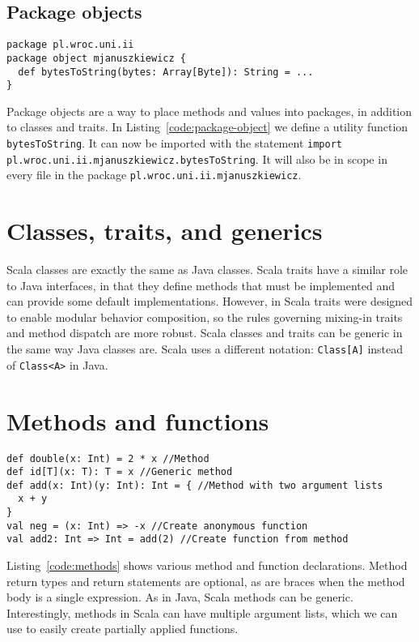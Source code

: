 \subsection{Package objects}

\begin{lstlisting}[caption=Package object, label=code:package-object, escapechar=|, float, floatplacement=H]
package pl.wroc.uni.ii
package object mjanuszkiewicz {
  def bytesToString(bytes: Array[Byte]): String = ...
}
\end{lstlisting}

Package objects are a way to place methods and values into packages, in addition to classes and traits.
In Listing~\ref{code:package-object} we define a utility function \texttt{bytesToString}.
It can now be imported with the statement \texttt{import pl.wroc.uni.ii.mjanuszkiewicz.bytesToString}.
It will also be in scope in every file in the package \texttt{pl.wroc.uni.ii.mjanuszkiewicz}.

\section{Classes, traits, and generics}

Scala classes are exactly the same as Java classes.
Scala traits have a similar role to Java interfaces, in that they define methods that must be implemented and can provide some default implementations.
However, in Scala traits were designed to enable modular behavior composition, so the rules governing mixing-in traits and method dispatch are more robust.
Scala classes and traits can be generic in the same way Java classes are.
Scala uses a different notation: \texttt{Class[A]} instead of \texttt{Class<A>} in Java.

\section{Methods and functions}

\begin{lstlisting}[caption=Methods and functions, label=code:methods, escapechar=|, float, floatplacement=H]
def double(x: Int) = 2 * x //Method
def id[T](x: T): T = x //Generic method
def add(x: Int)(y: Int): Int = { //Method with two argument lists
  x + y
}
val neg = (x: Int) => -x //Create anonymous function
val add2: Int => Int = add(2) //Create function from method
\end{lstlisting}

Listing~\ref{code:methods} shows various method and function declarations.
Method return types and return statements are optional, as are braces when the method body is a single expression.
As in Java, Scala methods can be generic.
Interestingly, methods in Scala can have multiple argument lists, which we can use to easily create partially applied functions.

